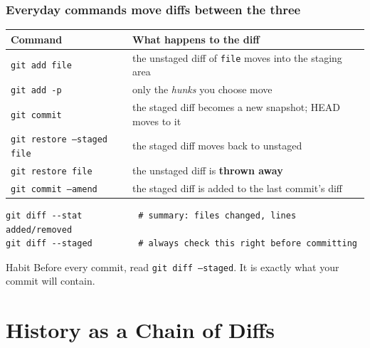\documentclass[aspectratio=169,10pt,compress]{beamer}
\newcommand{\cmd}[1]{\texttt{\color{gitred}#1}}
\begin{document}
\begin{frame}[t,fragile] \frametitle{Everyday commands move diffs between the three}
  \small
  \begin{tabular}{@{}L{0.3\textwidth}L{0.62\textwidth}@{}}
    \toprule
    \textbf{Command} & \textbf{What happens to the diff} \\
    \midrule
    \cmd{git add file} & the unstaged diff of \texttt{file} moves into the staging area \\
    \cmd{git add -p} & only the \emph{hunks} you choose move \\
    \cmd{git commit} & the staged diff becomes a new snapshot; HEAD moves to it \\
    \cmd{git restore --staged file} & the staged diff moves back to unstaged \\
    \cmd{git restore file} & the unstaged diff is \textbf{thrown away} \\
    \cmd{git commit --amend} & the staged diff is added to the last commit's diff \\
    \bottomrule
  \end{tabular}

  \vspace{0.8em}
  \normalsize
\begin{lstlisting}
git diff --stat           # summary: files changed, lines added/removed
git diff --staged         # always check this right before committing
\end{lstlisting}

  \begin{block}{Habit}
    Before every commit, read \cmd{git diff --staged}. It is exactly what your commit will contain.
  \end{block}
\end{frame}

\section[History]{History as a Chain of Diffs}
\end{document}
